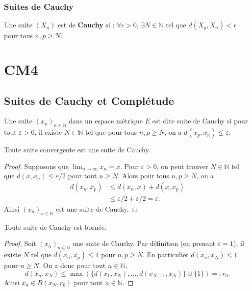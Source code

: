 \documentclass[oneside]{book}
\begin{document}
\subsection{Suites de Cauchy}
\begin{definition}
Une suite $(X_n)$ est de \textbf{Cauchy} si :
$\forall \epsilon > 0$, $\exists N \in \mathbb{N}$ tel que $d(X_p, X_n) < \epsilon$ pour tous $n, p \geq N$.
\end{definition}\chapter{CM4}
\sloppy

\section{Suites de Cauchy et Complétude}

\begin{definition}
Une suite $(x_n)_{n \in \mathbb{N}}$ dans un espace métrique $E$ est dite suite de Cauchy si pour tout $\varepsilon > 0$, il existe $N \in \mathbb{N}$ tel que pour tous $n, p \geq N$, on a $d(x_p, x_n) \leq \varepsilon$.
\end{definition}

\begin{proposition}
Toute suite convergente est une suite de Cauchy.
\end{proposition}
\begin{proof}
Supposons que $\lim_{n \to \infty} x_n = x$. Pour $\varepsilon > 0$, on peut trouver $N \in \mathbb{N}$ tel que $d(x, x_n) \leq \varepsilon/2$ pour tout $n \geq N$. Alors pour tous $n, p \geq N$, on a
\begin{align*}
d(x_n, x_p) &\leq d(x_n, x) + d(x, x_p) \\
&\leq \varepsilon/2 + \varepsilon/2 = \varepsilon.
\end{align*}
Ainsi $(x_n)_{n \in \mathbb{N}}$ est une suite de Cauchy.
\end{proof}

\begin{proposition}
Toute suite de Cauchy est bornée.
\end{proposition}
\begin{proof}
Soit $(x_n)_{n \in \mathbb{N}}$ une suite de Cauchy. Par définition (en prenant $\varepsilon = 1$), il existe $N$ tel que $d(x_n, x_p) \leq 1$ pour $n, p \geq N$. En particulier $d(x_n, x_N) \leq 1$ pour $n \geq N$. On a donc pour tout $n \in \mathbb{N}$,
$$d(x_n, x_N) \leq \max( \{d(x_1, x_N), \dots, d(x_{N-1}, x_N)\} \cup \{1\}) =: r_0.$$
Ainsi $x_n \in B(x_N, r_0)$ pour tout $n \in \mathbb{N}$.
\end{proof}
\end{document}
